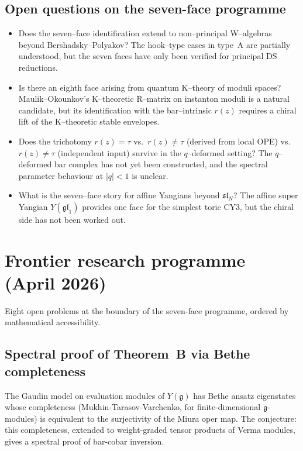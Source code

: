 \documentclass[11pt]{article}
\newcommand{\fg}{\mathfrak{g}}
\begin{document}
\subsection{Open questions on the seven-face programme}
\begin{itemize}
\item Does the seven--face identification extend to non--principal W--algebras
  beyond Bershadsky--Polyakov?  The hook--type cases in type~A are partially
  understood, but the seven faces have only been verified for principal DS
  reductions.
\item Is there an eighth face arising from quantum K--theory of moduli spaces?
  Maulik--Okounkov's K--theoretic R--matrix on instanton moduli is a natural
  candidate, but its identification with the bar--intrinsic $r(z)$ requires
  a chiral lift of the K--theoretic stable envelopes.
\item Does the trichotomy $r(z) = \tau$ vs.\ $r(z) \neq \tau$ (derived from
  local OPE) vs.\ $r(z) \neq \tau$ (independent input) survive in the
  $q$--deformed setting?  The $q$--deformed bar complex has not yet been
  constructed, and the spectral parameter behaviour at $|q| < 1$ is unclear.
\item What is the seven--face story for affine Yangians beyond
  $\mathfrak{sl}_N$?  The affine super Yangian $Y(\mathfrak{gl}_1)$ provides
  one face for the simplest toric CY3, but the chiral side has not been
  worked out.
\end{itemize}

\section{Frontier research programme (April 2026)}
\label{sec:frontier-research-programme}

Eight open problems at the boundary of the seven-face programme, ordered
by mathematical accessibility.

\subsection{Spectral proof of Theorem~B via Bethe completeness}

The Gaudin model on evaluation modules of $Y(\fg)$ has Bethe ansatz
eigenstates whose completeness (Mukhin-Tarasov-Varchenko, for
finite-dimensional $\fg$-modules) is equivalent to the surjectivity of
the Miura oper map.  The conjecture: this completeness, extended to
weight-graded tensor products of Verma modules, gives a spectral proof
of bar-cobar inversion.
\end{document}
